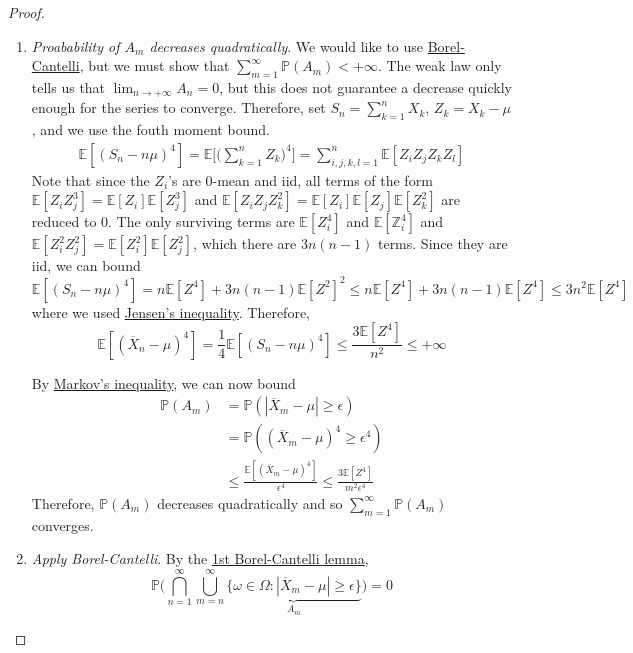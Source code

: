 \begin{proof}
\begin{enumerate}
			\item \textit{Proabability of $A_m$ decreases quadratically}. We would like to use \hyperref[thm:1st-borel-cantelli-lemma]{Borel-Cantelli}, but we must show that $\sum_{m=1}^\infty \mathbb{P}(A_m) < +\infty$. The weak law only tells us that $\lim_{n \to +\infty} A_n = 0$, but this does not guarantee a decrease quickly enough for the series to converge. Therefore, set $S_n = \sum_{k=1}^n X_k$, $Z_k = X_k - \mu$, and we use the fouth moment bound. 
				\begin{align}
					\mathbb{E}[(S_n - n \mu)^4] = \mathbb{E} \bigg[ \bigg( \sum_{k=1}^n Z_k \bigg)^4 \bigg] = \sum_{i, j, k, l = 1}^n \mathbb{E}[Z_i Z_j Z_k Z_l]
				\end{align}
				Note that since the $Z_i$'s are $0$-mean and iid, all terms of the form $\mathbb{E}[Z_i Z_j^3] = \mathbb{E}[Z_i] \mathbb{E}[Z_j^3]$ and $\mathbb{E}[Z_i Z_j Z_k^2] = \mathbb{E}[Z_i] \mathbb{E}[Z_j] \mathbb{E}[Z_k^2]$ are reduced to $0$. The only surviving terms are $\mathbb{E}[Z_i^4]$ and $\mathbb{E}[\mathbb{Z}_i^4]$ and $\mathbb{E}[Z_i^2 Z_j^2] = \mathbb{E}[Z_i^2]\mathbb{E}[Z_j^2]$, which there are $3n(n-1)$ terms. Since they are iid, we can bound 
				\begin{equation}
					\mathbb{E}[(S_n - n \mu)^4] = n \mathbb{E}[Z^4] + 3n(n-1) \mathbb{E}[Z^2]^2 \leq n \mathbb{E}[Z^4] + 3n(n-1) \mathbb{E}[Z^4] \leq 3n^2 \mathbb{E}[Z^4]
				\end{equation}
				where we used \hyperref[thm:jensens-inequality]{Jensen's inequality}. Therefore, 
				\begin{equation}
					\mathbb{E}[(\overline{X}_n - \mu)^4] = \frac{1}{4} \mathbb{E}[(S_n - n \mu)^4] \leq \frac{3 \mathbb{E}[Z^4]}{n^2} \leq +\infty
				\end{equation}

				By \hyperref[thm:markovs-inequality]{Markov's inequality}, we can now bound 
				\begin{align}
					\mathbb{P}(A_m) & = \mathbb{P}(|\overline{X}_m - \mu| \geq \epsilon) \\ 
													& = \mathbb{P}((\overline{X}_m - \mu)^4 \geq \epsilon^4) \\ 
													& \leq \frac{\mathbb{E}[(\overline{X}_m - \mu)^4]}{\epsilon^4} \leq \frac{3 \mathbb{E}[Z^4]}{m^2 \epsilon^4}
				\end{align}
				Therefore, $\mathbb{P}(A_m)$ decreases quadratically and so $\sum_{m=1}^\infty \mathbb{P}(A_m)$ converges. 

			\item \textit{Apply Borel-Cantelli}. By the \hyperref[thm:1st-borel-cantelli-lemma]{1st Borel-Cantelli lemma}, 
				\begin{equation}
					\mathbb{P} \bigg( \bigcap_{n=1}^\infty \bigcup_{m=n}^\infty \underbrace{\{ \omega \in \Omega \colon | \overline{X}_m - \mu| \geq \epsilon\}}_{A_m} \bigg) = 0
				\end{equation}
		\end{enumerate}
	\end{proof}

